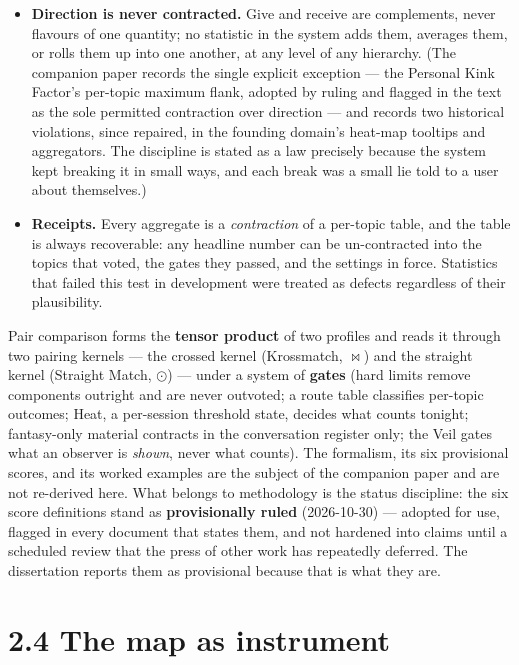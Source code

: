 \begin{itemize}
\tightlist
\item
  \textbf{Direction is never contracted.} Give and receive are
  complements, never flavours of one quantity; no statistic in the
  system adds them, averages them, or rolls them up into one another, at
  any level of any hierarchy. (The companion paper records the single
  explicit exception --- the Personal Kink Factor's per-topic maximum
  flank, adopted by ruling and flagged in the text as the sole permitted
  contraction over direction --- and records two historical violations,
  since repaired, in the founding domain's heat-map tooltips and
  aggregators. The discipline is stated as a law precisely because the
  system kept breaking it in small ways, and each break was a small lie
  told to a user about themselves.)
\item
  \textbf{Receipts.} Every aggregate is a \emph{contraction} of a
  per-topic table, and the table is always recoverable: any headline
  number can be un-contracted into the topics that voted, the gates they
  passed, and the settings in force. Statistics that failed this test in
  development were treated as defects regardless of their plausibility.
\end{itemize}

Pair comparison forms the \textbf{tensor product} of two profiles and
reads it through two pairing kernels --- the crossed kernel (Krossmatch,
$\bowtie$) and the straight kernel (Straight Match, $\odot$) --- under a system of
\textbf{gates} (hard limits remove components outright and are never
outvoted; a route table classifies per-topic outcomes; Heat, a
per-session threshold state, decides what counts tonight; fantasy-only
material contracts in the conversation register only; the Veil gates
what an observer is \emph{shown}, never what counts). The formalism, its
six provisional scores, and its worked examples are the subject of the
companion paper and are not re-derived here. What belongs to methodology
is the status discipline: the six score definitions stand as
\textbf{provisionally ruled} (2026-10-30) --- adopted for use, flagged
in every document that states them, and not hardened into claims until a
scheduled review that the press of other work has repeatedly deferred.
The dissertation reports them as provisional because that is what they
are.

\section{2.4 The map as instrument}\label{the-map-as-instrument}

